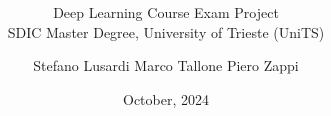 \documentclass{settings/laserbeam}
\title{
	\bft{Multi-Model Approach for Brain Tumor Classification and Segmentation}
}
\subtitle{\small{
	Deep Learning Course Exam Project\\
	SDIC Master Degree, University of Trieste (UniTS)
}}
\date{October, 2024}
\author{Stefano Lusardi \hspace{1cm} Marco Tallone \hspace{1cm} Piero Zappi}
\begin{document}
\frame{\titlepage} %








\end{document}
